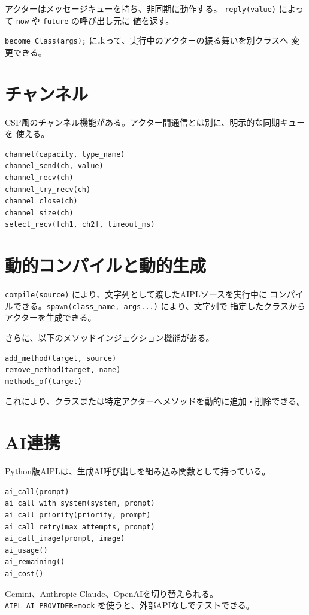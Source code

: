 \documentclass[11pt,a4paper,uplatex,dvipdfmx]{jsarticle}
\begin{document}
アクターはメッセージキューを持ち、非同期に動作する。
\texttt{reply(value)} によって \texttt{now} や \texttt{future} の呼び出し元に
値を返す。

\texttt{become Class(args);} によって、実行中のアクターの振る舞いを別クラスへ
変更できる。

\section{チャンネル}

CSP風のチャンネル機能がある。アクター間通信とは別に、明示的な同期キューを
使える。

\begin{lstlisting}[style=aipl]
channel(capacity, type_name)
channel_send(ch, value)
channel_recv(ch)
channel_try_recv(ch)
channel_close(ch)
channel_size(ch)
select_recv([ch1, ch2], timeout_ms)
\end{lstlisting}

\section{動的コンパイルと動的生成}

\texttt{compile(source)} により、文字列として渡したAIPLソースを実行中に
コンパイルできる。\texttt{spawn(class\_name, args...)} により、文字列で
指定したクラスからアクターを生成できる。

さらに、以下のメソッドインジェクション機能がある。

\begin{lstlisting}[style=aipl]
add_method(target, source)
remove_method(target, name)
methods_of(target)
\end{lstlisting}

これにより、クラスまたは特定アクターへメソッドを動的に追加・削除できる。

\section{AI連携}

Python版AIPLは、生成AI呼び出しを組み込み関数として持っている。

\begin{lstlisting}[style=aipl]
ai_call(prompt)
ai_call_with_system(system, prompt)
ai_call_priority(priority, prompt)
ai_call_retry(max_attempts, prompt)
ai_call_image(prompt, image)
ai_usage()
ai_remaining()
ai_cost()
\end{lstlisting}

Gemini、Anthropic Claude、OpenAIを切り替えられる。
\texttt{AIPL\_AI\_PROVIDER=mock} を使うと、外部APIなしでテストできる。
\end{document}
